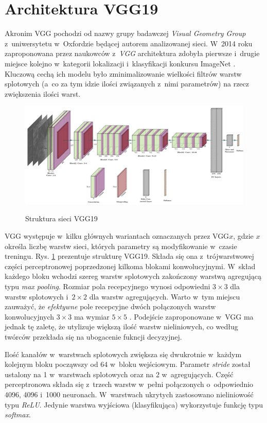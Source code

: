 \section{Architektura VGG19}

Akronim VGG pochodzi od nazwy grupy badawczej \textit{Visual Geometry Group} z~uniwersytetu w~Oxfordzie będącej autorem analizowanej sieci. W~2014 roku zaproponowana przez naukowców z~\textit{VGG} architektura zdobyła pierwsze i~drugie miejsce kolejno w~kategorii lokalizacji i~klasyfikacji konkursu ImageNet \cite{vgg19}. Kluczową cechą ich modelu było zminimalizowanie wielkości filtrów warstw splotowych (a~co za tym idzie ilości związanych z~nimi parametrów) na rzecz zwiększenia ilości warst.

\vspace{0.5cm}
\begin{figure}[h]
    \centering
    \includegraphics[scale=0.35]{img/vgg_structure.png}
    \label{vgg_structure_img}
    \caption{Struktura sieci VGG19}
\end{figure}
\vspace{0.5cm}

\noindent
VGG występuje w~kilku głównych wariantach oznaczanych przez VGG$x$, gdzie $x$ określa liczbę warstw sieci, których parametry są modyfikowanie w~czasie treningu. Rys. \ref{vgg_structure_img} prezentuje strukturę VGG19. Składa się ona z~trójwarstwowej części perceptronowej poprzedzonej kilkoma blokami konwolucyjnymi. W~skład każdego bloku wchodzi szereg warstw splotowych zakończony warstwą agregującą typu \textit{max pooling}. Rozmiar pola recepcyjnego wynosi odpowiedni $3\times3$ dla warstw splotowych i~$2\times2$ dla warstw agregujących. Warto w~tym miejscu zauważyć, że \textit{efektywne} pole recepcyjne dwóch połączonych warstw konwolucyjnych $3\times3$ ma wymiar $5\times5$ \cite{recept_field}. Podejście zaproponowane w~VGG ma jednak tę zaletę, że utylizuje większą ilość warstw nieliniowych, co według twórców przekłada się na ubogacenie fukncji decyzyjnej.

Ilość kanałów w~warstwach splotowych zwiększa się dwukrotnie w~każdym kolejnym bloku począwszy od 64 w~bloku wejściowym. Parametr \textit{stride} został ustalony na 1 w~warstwach splotowych oraz na 2 w~agregujących. Część perceptronowa składa się z~trzech warstw w~pełni połączonych o~odpowiednio 4096, 4096 i~1000 neuronach. W~warstwach ukrytych zastosowano nieliniowość typu \textit{ReLU}. Jedynie warstwa wyjściowa (klasyfikująca) wykorzystuje funkcję typu \textit{softmax}.